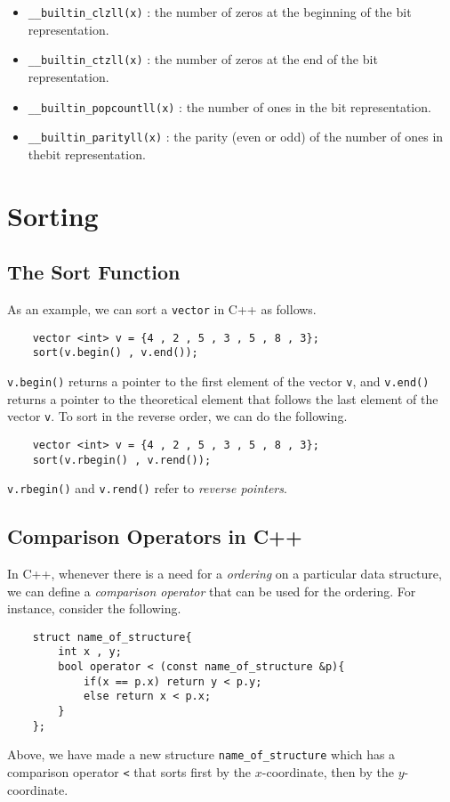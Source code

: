 \documentclass[12pt,a4paper]{amsart}
\numberwithin{equation}{section}
\theoremstyle{definition}
\begin{document}
\begin{itemize}
    \item \verb|__builtin_clzll(x)| : the number of zeros at the beginning of the bit representation.
    \item \verb|__builtin_ctzll(x)| : the number of zeros at the end of the bit representation.
    \item \verb|__builtin_popcountll(x)| : the number of ones in the bit representation.
    \item \verb|__builtin_parityll(x)| : the parity (even or odd) of the number of ones in thebit representation.
\end{itemize}

\section{Sorting}
\subsection{The Sort Function} As an example, we can sort a \verb|vector| in C++ as follows. 
\begin{lstlisting}
    vector <int> v = {4 , 2 , 5 , 3 , 5 , 8 , 3};
    sort(v.begin() , v.end());
\end{lstlisting}
\verb|v.begin()| returns a pointer to the first element of the vector \verb|v|, and \verb|v.end()| returns a pointer to the theoretical element that follows the last element of the vector \verb|v|. To sort in the reverse order, we can do the following. 
\begin{lstlisting}
    vector <int> v = {4 , 2 , 5 , 3 , 5 , 8 , 3};
    sort(v.rbegin() , v.rend());
\end{lstlisting}
\verb|v.rbegin()| and \verb|v.rend()| refer to \textit{reverse pointers}. 

\subsection{Comparison Operators in C++} In C++, whenever there is a need for a \textit{ordering} on a particular data structure, we can define a \textit{comparison operator} that can be used for the ordering. For instance, consider the following. 
\begin{lstlisting}
    struct name_of_structure{
        int x , y;
        bool operator < (const name_of_structure &p){
            if(x == p.x) return y < p.y;
            else return x < p.x;
        }
    };
\end{lstlisting}
Above, we have made a new structure \verb|name_of_structure| which has a comparison operator \verb|<| that sorts first by the $x$-coordinate, then by the $y$-coordinate.
\end{document}
